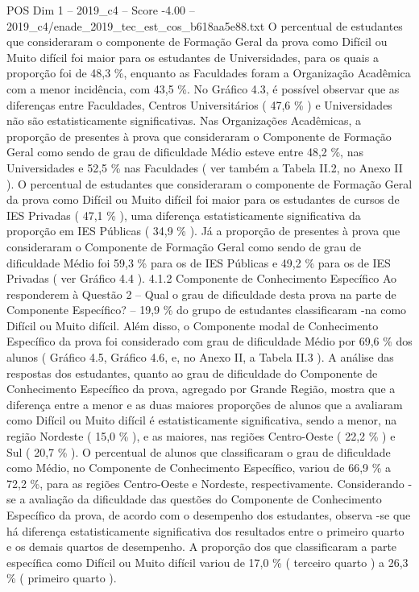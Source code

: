 \begin{textsample}{POS Dim 1 – 2019\_c4 – Score -4.00 – 2019\_c4/enade\_2019\_tec\_est\_cos\_b618aa5e88.txt}
O percentual de estudantes que consideraram o componente de Formação Geral da prova como Difícil ou Muito difícil foi maior para os estudantes de Universidades, para os quais a proporção foi de 48,3 \%, enquanto as Faculdades foram a Organização Acadêmica com a menor incidência, com 43,5 \%.
No Gráfico 4.3, é possível observar que as diferenças entre Faculdades, Centros Universitários ( 47,6 \% ) e Universidades não são estatisticamente significativas.
Nas Organizações Acadêmicas, a proporção de presentes à prova que consideraram o Componente de Formação Geral como sendo de grau de dificuldade Médio esteve entre 48,2 \%, nas Universidades e 52,5 \% nas Faculdades ( ver também a Tabela II.2, no Anexo II ).
O percentual de estudantes que consideraram o componente de Formação Geral da prova como Difícil ou Muito difícil foi maior para os estudantes de cursos de IES Privadas ( 47,1 \% ), uma diferença estatisticamente significativa da proporção em IES Públicas ( 34,9 \% ).
Já a proporção de presentes à prova que consideraram o Componente de Formação Geral como sendo de grau de dificuldade Médio foi 59,3 \% para os de IES Públicas e 49,2 \% para os de IES Privadas ( ver Gráfico 4.4 ). 4.1.2 Componente de Conhecimento Específico Ao responderem à Questão 2 – Qual o grau de dificuldade desta prova na parte de Componente Específico? – 19,9 \% do grupo de estudantes classificaram -na como Difícil ou Muito difícil.
Além disso, o Componente modal de Conhecimento Específico da prova foi considerado com grau de dificuldade Médio por 69,6 \% dos alunos ( Gráfico 4.5, Gráfico 4.6, e, no Anexo II, a Tabela II.3 ).
A análise das respostas dos estudantes, quanto ao grau de dificuldade do Componente de Conhecimento Específico da prova, agregado por Grande Região, mostra que a diferença entre a menor e as duas maiores proporções de alunos que a avaliaram como Difícil ou Muito difícil é estatisticamente significativa, sendo a menor, na região Nordeste ( 15,0 \% ), e as maiores, nas regiões Centro-Oeste ( 22,2 \% ) e Sul ( 20,7 \% ).
O percentual de alunos que classificaram o grau de dificuldade como Médio, no Componente de Conhecimento Específico, variou de 66,9 \% a 72,2 \%, para as regiões Centro-Oeste e Nordeste, respectivamente.
Considerando -se a avaliação da dificuldade das questões do Componente de Conhecimento Específico da prova, de acordo com o desempenho dos estudantes, observa -se que há diferença estatisticamente significativa dos resultados entre o primeiro quarto e os demais quartos de desempenho.
A proporção dos que classificaram a parte específica como Difícil ou Muito difícil variou de 17,0 \% ( terceiro quarto ) a 26,3 \% ( primeiro quarto ).

\end{textsample}
